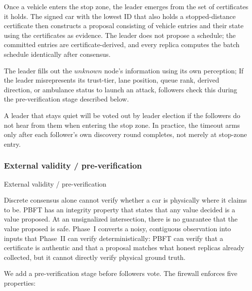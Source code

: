\documentclass[letterpaper,10pt,conference]{IEEEtran}
\begin{document}
Once a vehicle enters the stop zone, the leader emerges from the set of certificates it holds. The signed car with the lowest ID that also holds a stopped-distance certificate then constructs a proposal consisting of vehicle entries and their state using the certificates as evidence. The leader does not propose a schedule; the committed entries are certificate-derived, and every replica computes the batch schedule identically after consensus.

The leader fills out the $unknown$ node's information using its own perception; If the leader misrepresents its trust-tier, lane position, queue rank, derived direction, or ambulance status to launch an attack, followers check this during the pre-verification stage described below. 

A leader that stays quiet will be voted out by leader election if the followers do not hear from them when entering the stop zone. In practice, the timeout arms only after each follower's own discovery round completes, not merely at stop-zone entry.



\subsubsection{External validity / pre-verification}


External validity / pre-verification

Discrete consensus alone cannot verify whether a car is physically where it claims to be. PBFT has an integrity property that states that any value decided is a value proposed. At an unsignalized intersection, there is no guarantee that the value proposed is safe. Phase~I converts a noisy, contiguous observation into inputs that Phase~II can verify deterministically: PBFT can verify that a certificate is authentic and that a proposal matches what honest replicas already collected, but it cannot directly verify physical ground truth.

We add a pre-verification stage before followers vote. The firewall enforces five properties:
\end{document}
